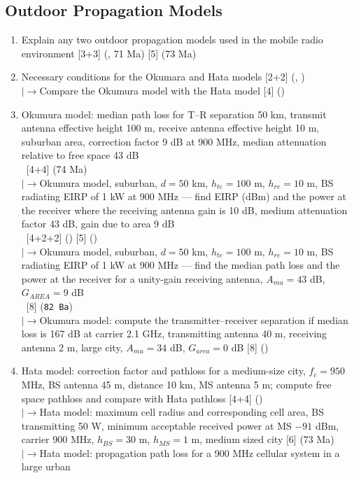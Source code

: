 \documentclass[12pt]{article}
\newcommand{\lb}{\\$\left|\rightarrow\right.$}
\newcommand{\enter}{\\\textcolor{white}{1}}
\begin{document}
  \subsection{Outdoor Propagation Models}
    \begin{enumerate}[topsep=0pt, noitemsep]
      \item Explain any two outdoor propagation models used in the mobile radio environment
        \hfill [3+3] (, 71 Ma) [5] (73 Ma)
      \item Necessary conditions for the Okumara and Hata models \hfill [2+2] (, )
        \lb Compare the Okumura model with the Hata model \hfill [4] ()
      \item Okumura model: median path loss for T--R separation 50 km, transmit antenna
        effective height 100 m, receive antenna effective height 10 m, suburban area,
        correction factor 9 dB at 900 MHz, median attenuation relative to free space 43 dB
        \enter\hfill [4+4] (74 Ma)
        \lb Okumura model, suburban, $d{=}50$ km, $h_{te}{=}100$ m, $h_{re}{=}10$ m, BS radiating
        EIRP of 1 kW at 900 MHz --- find EIRP (dBm) and the power at the receiver where the
        receiving antenna gain is 10 dB, medium attenuation factor 43 dB, gain due to area 9 dB
        \enter\hfill [4+2+2] () [5] ()
        \lb Okumura model, suburban, $d{=}50$ km, $h_{te}{=}100$ m, $h_{re}{=}10$ m, BS radiating
        EIRP of 1 kW at 900 MHz --- find the median path loss and the power at the receiver
        for a unity-gain receiving antenna, $A_{mu} = 43$ dB, $G_{AREA} = 9$ dB
        \enter\hfill [8] (\texttt{82 Ba})
        \lb Okumura model: compute the transmitter--receiver separation if median loss is
        167 dB at carrier 2.1 GHz, transmitting antenna 40 m, receiving antenna 2 m,
        large city, $A_{mu} = 34$ dB, $G_{area} = 0$ dB \hfill [8] ()
      \item Hata model: correction factor and pathloss for a medium-size city, $f_c{=}950$ MHz,
        BS antenna 45 m, distance 10 km, MS antenna 5 m; compute free space pathloss and
        compare with Hata pathloss \hfill [4+4] ()
        \lb Hata model: maximum cell radius and corresponding cell area, BS transmitting 50 W,
        minimum acceptable received power at MS $-91$ dBm, carrier 900 MHz,
        $h_{BS}{=}30$ m, $h_{MS}{=}1$ m, medium sized city \hfill [6] (73 Ma)
        \lb Hata model: propagation path loss for a 900 MHz cellular system in a large urban

\end{enumerate}
\end{document}

